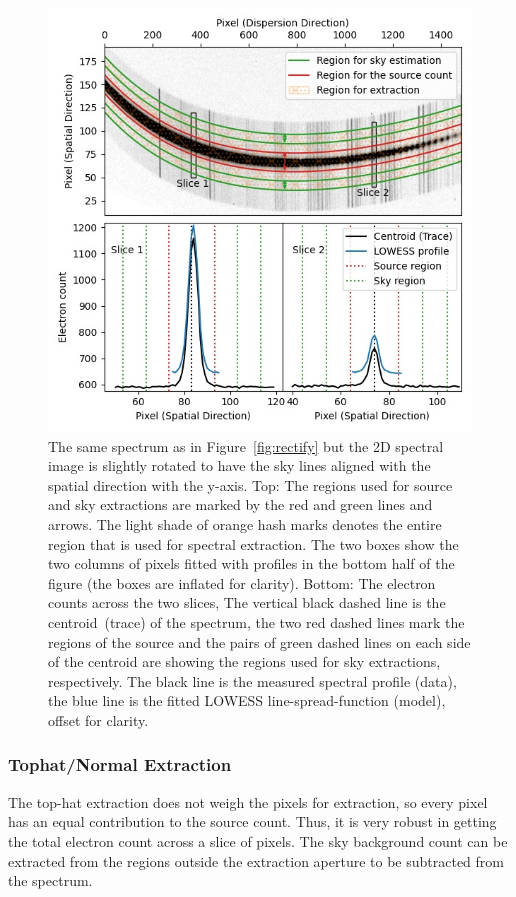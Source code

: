 \documentclass[fleqn,usenatbib]{mnras}
\begin{document}
\begin{figure}
    \centering
    \includegraphics[width=\columnwidth]{fig_03_extraction_profile.jpg}
    \caption{The same spectrum as in Figure~\ref{fig:rectify} but the
    2D spectral image is slightly rotated to have the sky lines
    aligned with the spatial direction with the y-axis.
    Top: The regions used for source and sky extractions are marked
    by the red and green lines and arrows. The light shade of orange
    hash marks denotes the entire region that is used for spectral extraction.
    The two boxes show the two columns of pixels fitted with
    profiles in the bottom half of the figure (the boxes are inflated
    for clarity). Bottom: The electron counts across the two slices,
    The vertical black dashed line is the centroid~(trace) of the spectrum,
    the two red dashed lines mark the regions of the source and the
    pairs of green dashed lines on each side of the centroid are
    showing the regions used for sky extractions, respectively. The
    black line is the measured spectral profile (data), the blue
    line is the fitted LOWESS line-spread-function (model), offset for
    clarity.}
    \label{fig:extraction}
\end{figure}

\subsubsection*{Tophat/Normal Extraction}
The top-hat extraction does not weigh the pixels for extraction,
so every pixel has an equal contribution to the source count. Thus,
it is very robust in getting the total electron count across
a slice of pixels. The sky background count can be extracted
from the regions outside the extraction aperture to be
subtracted from the spectrum.
\end{document}
